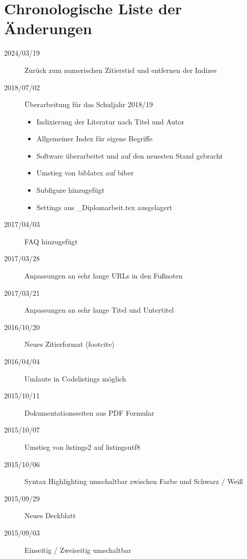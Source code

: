 \chapter{Chronologische Liste der Änderungen}

\begin{sloppypar}
\begin{description}

\item[2024/03/19]
Zurück zum numerischen Zitierstiel und entfernen der Indizes

\item[2018/07/02]
Überarbeitung für das Schuljahr 2018/19
\begin{itemize}
  \item Indixierung der Literatur nach Titel und Autor
  \item Allgemeiner Index für eigene Begriffe
  \item Software überarbeitet und auf den neuesten Stand gebracht
  \item Umstieg von biblatex auf biber
  \item Subfigure hinzugefügt
  \item Settings aus \_Diplomarbeit.tex ausgelagert
\end{itemize}


\item[2017/04/03]
FAQ hinzugefügt

\item[2017/03/28]
Anpassungen an sehr lange URLs in den Fußnoten

\item[2017/03/21]
Anpassungen an sehr lange Titel und Untertitel

\item[2016/10/20]
Neues Zitierformat (footcite)

\item[2016/04/04]
Umlaute in Codelistings möglich

\item[2015/10/11]
Dokumentationsseiten aus PDF Formular

\item[2015/10/07]
Umstieg von listings2 auf listingsutf8

\item[2015/10/06]
Syntax Highlighting umschaltbar zwischen Farbe und Schwarz / Weiß

\item[2015/09/29]
Neues Deckblatt

\item[2015/09/03]
Einseitig / Zweiseitig umschaltbar 


\end{description}
\end{sloppypar}
